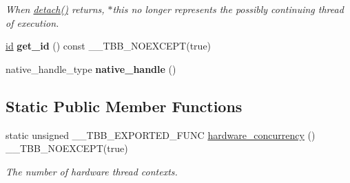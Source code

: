 \begin{DoxyCompactItemize}
\begin{DoxyCompactList}\small\item\em When \hyperlink{classtbb_1_1internal_1_1tbb__thread__v3_aed1dc35a70fc537682452a1c7bd77faf}{detach()} returns, $\ast$this no longer represents the possibly continuing thread of execution. \end{DoxyCompactList}\item 
\hypertarget{classtbb_1_1internal_1_1tbb__thread__v3_ae98915bfeccaa90d6f13add0ee1ab33a}{}\hyperlink{classtbb_1_1internal_1_1tbb__thread__v3_1_1id}{id} {\bfseries get\+\_\+id} () const \+\_\+\+\_\+\+T\+B\+B\+\_\+\+N\+O\+E\+X\+C\+E\+P\+T(true)\label{classtbb_1_1internal_1_1tbb__thread__v3_ae98915bfeccaa90d6f13add0ee1ab33a}

\item 
\hypertarget{classtbb_1_1internal_1_1tbb__thread__v3_a98e89e22e11fb6cab05f0f7839c79310}{}native\+\_\+handle\+\_\+type {\bfseries native\+\_\+handle} ()\label{classtbb_1_1internal_1_1tbb__thread__v3_a98e89e22e11fb6cab05f0f7839c79310}

\end{DoxyCompactItemize}
\subsection*{Static Public Member Functions}
\begin{DoxyCompactItemize}
\item 
static unsigned \+\_\+\+\_\+\+T\+B\+B\+\_\+\+E\+X\+P\+O\+R\+T\+E\+D\+\_\+\+F\+U\+N\+C \hyperlink{classtbb_1_1internal_1_1tbb__thread__v3_a8a4400580483a912df7b793ce1dfc711}{hardware\+\_\+concurrency} () \+\_\+\+\_\+\+T\+B\+B\+\_\+\+N\+O\+E\+X\+C\+E\+P\+T(true)
\begin{DoxyCompactList}\small\item\em The number of hardware thread contexts. \end{DoxyCompactList}\end{DoxyCompactItemize}
